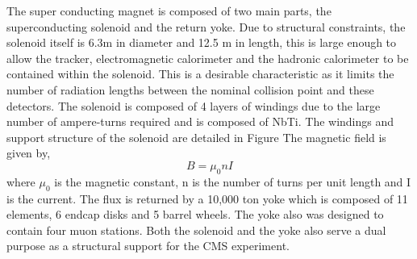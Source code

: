 The super conducting magnet is composed of two main parts, the superconducting
solenoid and the return yoke.
Due to structural constraints, the solenoid itself is 6.3m in diameter and 12.5 m in length,
this is large enough to allow the tracker, electromagnetic calorimeter
and the hadronic calorimeter to be contained within the solenoid. This is
a desirable characteristic as it limits the number of radiation
lengths between the nominal collision point and these detectors. The solenoid
is composed of 4 layers of windings due to the large number of ampere-turns required
and is composed of NbTi. The windings and support structure of the solenoid
are detailed in Figure \cite{fig:magnetLayout}%
The magnetic field is given by,
\begin{displaymath}
B=\mu_{0}nI
\end{displaymath}
where $\mu_{0}$ is the magnetic constant, n is the number of turns per unit length and 
I is the current. 
The flux is returned by a 10,000 ton yoke which is composed of 11 elements, 6 endcap disks 
and 5 barrel wheels. The yoke also was designed to contain four muon stations. 
Both the solenoid and the yoke also serve a dual purpose as a structural support 
for the CMS experiment. 